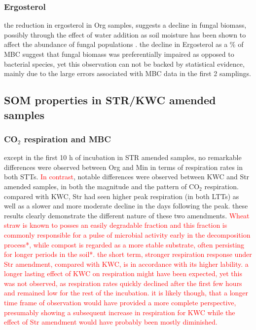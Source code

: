 \documentclass[12pt]{report}
\newcommand{\myRed}[1]{\textcolor{red}{#1}} %
\begin{document}
\subsubsection{Ergosterol}

the reduction in ergosterol in Org samples, suggests a decline in fungal biomass, possibly through the effect of water addition as soil moisture has been shown to affect the abundance of fungal populations \citep{drenovsky2004, griffin1963}. the decline in Ergosterol as a \% of MBC suggest that fungal biomass was preferentially impaired as opposed to bacterial species, yet this observation can not be backed by statistical evidence, mainly due to the large errors associated with MBC data in the first 2 samplings.  

\subsection{SOM properties in STR/KWC amended samples}

\subsubsection{CO$_2 $ respiration and MBC}

except in the first 10 h of incubation in STR amended samples, no remarkable differences were observed between Org and Min in terms of respiration rates in both STTs. \myRed{In contrast}, notable differences were observed between KWC and Str amended samples, in both the magnitude and the pattern of CO$ _2 $ respiration. compared with KWC, Str had seen higher peak respiration (in both LTTs) as well as a slower and more moderate decline in the days following the peak. these results clearly demonstrate the different nature of these two amendments. \myRed{Wheat straw is known to posses an easily degradable fraction and this fraction is commonly responsible for a pulse of microbial activity early in the decomposition process\myRed{*}, while compost is regarded as a more stable substrate, often persisting for longer periods in the soil\myRed{*}. the short term, stronger respiration response under Str amendment, compared with KWC, is in accordance with its higher lability. a longer lasting effect of KWC on respiration might have been expected, yet this was not observed, as respiration rates quickly declined after the first few hours and remained low for the rest of the incubation. it is likely though, that a longer time frame of observation would have provided a more complete perspective, presumably showing a subsequent increase in respiration for KWC  while the effect of Str amendment would have probably been mostly diminished.}
\end{document}
